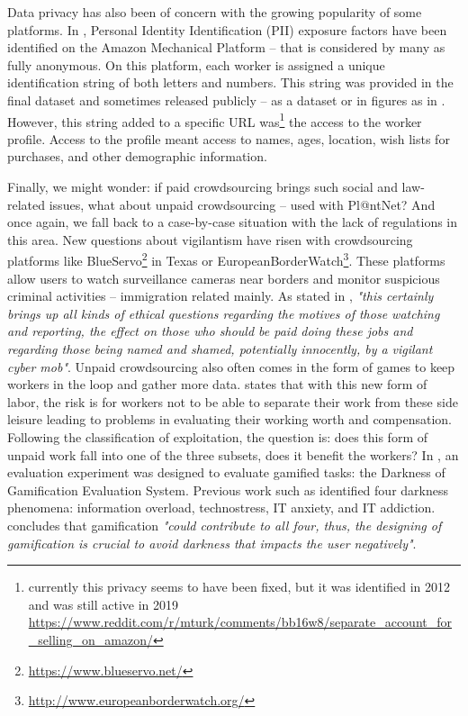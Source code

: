 Data privacy has also been of concern with the growing popularity of some platforms.
In \citet{lease2013mechanical}, Personal Identity Identification (PII) exposure factors have been identified on the Amazon Mechanical Platform -- that is considered by many as fully anonymous.
On this platform, each worker is assigned a unique identification string of both letters and numbers.
This string was provided in the final dataset and sometimes released publicly -- as a dataset or in figures as in \citet{gao2015cost}.
However, this string added to a specific URL was\footnote{currently this privacy seems to have been fixed, but it was identified in 2012 and was still active in 2019 \url{https://www.reddit.com/r/mturk/comments/bb16w8/separate_account_for_selling_on_amazon/}} the access to the worker profile.
Access to the profile meant access to names, ages, location, wish lists for purchases, and other demographic information.

Finally, we might wonder: if paid crowdsourcing brings such social and law-related issues, what about unpaid crowdsourcing -- used with Pl@ntNet?
And once again, we fall back to a case-by-case situation with the lack of regulations in this area.
New questions about vigilantism have risen with crowdsourcing platforms like BlueServo\footnote{\url{https://www.blueservo.net/}} in Texas or EuropeanBorderWatch\footnote{\url{http://www.europeanborderwatch.org/}}.
These platforms allow users to watch surveillance cameras near borders and monitor suspicious criminal activities -- immigration related mainly.
As stated in \citet{schmidt2013good}, \emph{"this
certainly brings up all kinds of ethical questions regarding the motives of those watching and reporting, the effect on those who should be paid doing these jobs and regarding those being named and shamed, potentially innocently, by a vigilant cyber mob"}.
Unpaid crowdsourcing also often comes in the form of games to keep workers in the loop and gather more data.
\citet{roglallwork} states that with this new form of labor, the risk is for workers not to be able to separate their work from these side leisure leading to problems in evaluating their working worth and compensation.
Following the classification of exploitation, the question is: does this form of unpaid work fall into one of the three subsets, does it benefit the workers?
In \citet{nystrom2021exploring}, an evaluation experiment was designed to evaluate gamified tasks: the Darkness of Gamification Evaluation System.
Previous work such as \citet{pirkkalainen2016two} identified four darkness phenomena: information overload, technostress, IT anxiety, and IT addiction.
\citet{nystrom2021exploring} concludes that gamification \emph{"could contribute to all four, thus, the designing of gamification is crucial to avoid darkness that impacts the user negatively"}.

